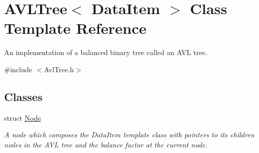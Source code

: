 \hypertarget{classAVLTree}{\section{A\-V\-L\-Tree$<$ Data\-Item $>$ Class Template Reference}
\label{classAVLTree}
}


An implementation of a balanced binary tree called an A\-V\-L tree.  




{\ttfamily \#include $<$Avl\-Tree.\-h$>$}

\subsection*{Classes}
\begin{DoxyCompactItemize}
\item 
struct \hyperlink{structAVLTree_1_1Node}{Node}
\begin{DoxyCompactList}\small\item\em A node which composes the Data\-Item template class with pointers to its children nodes in the A\-V\-L tree and the balance factor at the current node. \end{DoxyCompactList}\end{DoxyCompactItemize}
